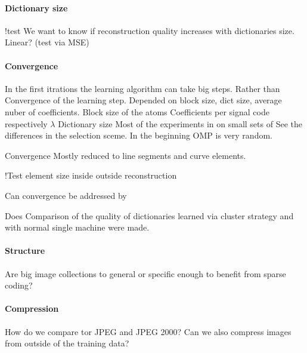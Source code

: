 \paragraph{Dictionary size}
!test
We want to know if reconstruction quality increases with dictionaries
size. Linear? (test via MSE)


\paragraph{Convergence}
In the first itrations the learning algorithm can take big steps.
Rather than 
Convergence of the learning step. 
Depended on block size, dict size, average nuber of coefficients.
Block size of the atoms
Coefficients per signal code respectively $\lambda$
Dictionary size 
Most of the experiments in on small sets of 
See the differences in the selection sceme.
In the beginning OMP is very random.


Convergence
Mostly reduced to line segments and curve elements.

!Test element size inside outside reconstruction

Can convergence be addressed by 

Does 
Comparison of the quality of dictionaries learned via cluster strategy and
with normal single machine were made.

\paragraph{Structure}
Are big image collections to general or specific enough to benefit from sparse
coding?

\paragraph{Compression}
How do we compare tor JPEG and JPEG 2000?
Can we also compress images from outside of the training data?


